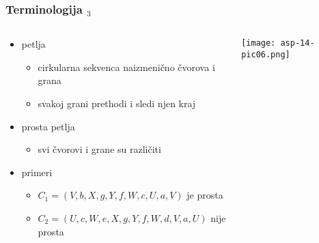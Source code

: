 \documentclass[compress,aspectratio=169]{beamer}
\begin{document}
\begin{frame}[fragile]
  \frametitle{Terminologija $_{3}$}
  \begin{columns}
    \begin{column}[t]{9cm}
      \begin{itemize}
        \item petlja
        \begin{itemize}
          \item cirkularna sekvenca naizmenično čvorova i grana
          \item svakoj grani prethodi i sledi njen kraj
        \end{itemize}
        \item prosta petlja
        \begin{itemize}
          \item svi čvorovi i grane su različiti
        \end{itemize}
        \item primeri
        \begin{itemize}
          \item $C_{1}=(V,b,X,g,Y,f,W,c,U,a,V)$ je prosta
          \item $C_{2}=(U,c,W,e,X,g,Y,f,W,d,V,a,U)$ nije prosta
        \end{itemize}
      \end{itemize}
    \end{column}
    \begin{column}[t]{4.5cm}
      \begin{center}
        \texttt{[image: asp-14-pic06.png]}
      \end{center}
    \end{column}
  \end{columns}
\end{frame}
\end{document}

